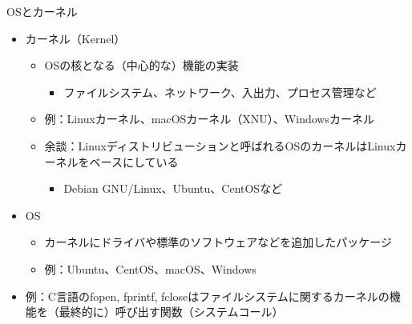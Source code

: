 \documentclass[12pt,aspectratio=169]{beamer}
\begin{document}
\begin{frame}{OSとカーネル}
  \begin{itemize}
    \item カーネル（Kernel）
      \begin{itemize}
        \item OSの核となる（中心的な）機能の実装
          \begin{itemize}
            \item ファイルシステム、ネットワーク、入出力、プロセス管理など
          \end{itemize}
        \item 例：Linuxカーネル、macOSカーネル（XNU）、Windowsカーネル
        \item 余談：Linuxディストリビューションと呼ばれるOSのカーネルはLinuxカーネルをベースにしている
          \begin{itemize}
            \item Debian GNU/Linux、Ubuntu、CentOSなど
          \end{itemize}
      \end{itemize}

      \item OS
        \begin{itemize}
          \item カーネルにドライバや標準のソフトウェアなどを追加したパッケージ
          \item 例：Ubuntu、CentOS、macOS、Windows
        \end{itemize}

      \item 例：C言語のfopen, fprintf, fcloseはファイルシステムに関するカーネルの機能を（最終的に）呼び出す関数（システムコール）
  \end{itemize}

\end{frame}
\end{document}
